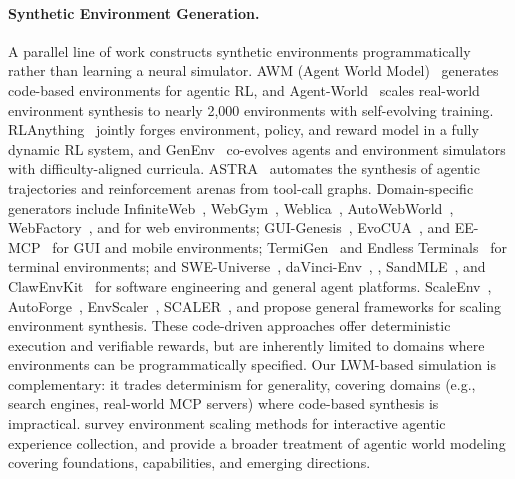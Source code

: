 \paragraph{Synthetic Environment Generation.}
A parallel line of work constructs synthetic environments programmatically rather than learning a neural simulator.
AWM (Agent World Model)~\citep{wang2026agent} generates code-based environments for agentic RL, and Agent-World~\citep{dong2026agent} scales real-world environment synthesis to nearly 2,000 environments with self-evolving training.
RLAnything~\citep{wang2026rlanything} jointly forges environment, policy, and reward model in a fully dynamic RL system, and GenEnv~\citep{guo2025genenv} co-evolves agents and environment simulators with difficulty-aligned curricula.
ASTRA~\citep{tian2026astra} automates the synthesis of agentic trajectories and reinforcement arenas from tool-call graphs.
Domain-specific generators include InfiniteWeb~\citep{zhang2026infiniteweb}, WebGym~\citep{bai2026webgym}, Weblica~\citep{kar2026weblicascalablereproducibletraining}, AutoWebWorld~\citep{wu2026autowebworld}, WebFactory~\citep{fan2026webfactory}, and \citet{chae2026safe} for web environments; GUI-Genesis~\citep{cao2026gui}, EvoCUA~\citep{xue2026evocua}, and EE-MCP~\citep{he2026ee} for GUI and mobile environments; TermiGen~\citep{zhu2026termigen} and Endless Terminals~\citep{gandhi2026endless} for terminal environments; and SWE-Universe~\citep{chen2026swe}, daVinci-Env~\citep{fu2026davinci}, \citet{zhao2026immersion}, SandMLE~\citep{zhou2026synthetic}, and ClawEnvKit~\citep{li2026clawenvkit} for software engineering and general agent platforms.
ScaleEnv~\citep{tu2026scaleenv}, AutoForge~\citep{cai2025autoforge}, EnvScaler~\citep{song2026envscaler}, SCALER~\citep{xu2026scaler}, and \citet{fang2025towards} propose general frameworks for scaling environment synthesis.
These code-driven approaches offer deterministic execution and verifiable rewards, but are inherently limited to domains where environments can be programmatically specified.
Our LWM-based simulation is complementary: it trades determinism for generality, covering domains (e.g., search engines, real-world MCP servers) where code-based synthesis is impractical.
\citet{huang2025environment} survey environment scaling methods for interactive agentic experience collection, and \citet{chu2026agentic} provide a broader treatment of agentic world modeling covering foundations, capabilities, and emerging directions.
